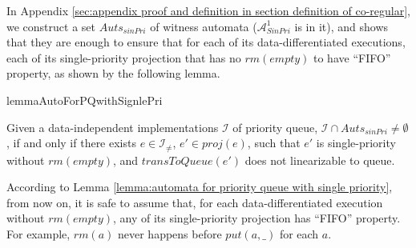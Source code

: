 In Appendix \ref{sec:appendix proof and definition in section definition of co-regular}, we construct a set $\textit{Auts}_{\textit{sinPri}}$ of witness automata ($\mathcal{A}_{\textit{SinPri}}^1$ is in it), and shows that they are enough to ensure that for each of its data-differentiated executions, each of its single-priority projection that has no $\textit{rm}(\textit{empty})$ to have ``FIFO'' property, as shown by the following lemma.

\begin{restatable}{lemma}{AutoForPQwithSignlePri}
\label{lemma:automata for priority queue with single priority}

Given a data-independent implementations $\mathcal{I}$ of priority queue, $\mathcal{I} \cap \textit{Auts}_{\textit{sinPri}} \neq \emptyset$, if and only if there exists $e \in \mathcal{I}_{\neq}$, $e' \in \textit{proj}(e)$, such that $e'$ is single-priority  without $\textit{rm}(\textit{empty})$, and $\textit{transToQueue}(e')$ does not linearizable to queue.
\end{restatable}

According to Lemma \ref{lemma:automata for priority queue with single priority}, from now on, it is safe to assume that, for each data-differentiated execution without $\textit{rm}(\textit{empty})$, any of its single-priority projection has ``FIFO'' property. For example, $\textit{rm}(a)$ never happens before $\textit{put}(a,\_)$ for each $a$. 